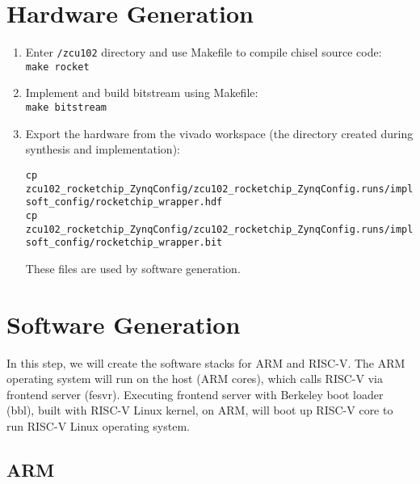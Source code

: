 \documentclass[a4paper,11pt]{article}
\begin{document}
\section{Hardware Generation}
\begin{enumerate}
\item Enter  {\tt \rootdir/zcu102} directory and use Makefile to compile chisel source code:\\
{\tt make rocket}
\item Implement and build bitstream using Makefile:\\
 {\tt make bitstream}
 

\item Export the hardware from the vivado workspace (the directory created during synthesis and implementation):
\begin{lstlisting}
cp zcu102_rocketchip_ZynqConfig/zcu102_rocketchip_ZynqConfig.runs/impl_1/rocketchip_wrapper.sysdef soft_config/rocketchip_wrapper.hdf
cp zcu102_rocketchip_ZynqConfig/zcu102_rocketchip_ZynqConfig.runs/impl_1/rocketchip_wrapper.bit soft_config/rocketchip_wrapper.bit
\end{lstlisting}
These files are used by software generation.
\end{enumerate}

\section{Software Generation}
In this step, we will create the software stacks for ARM and RISC-V. The ARM operating system will run on the host (ARM cores), which calls RISC-V via frontend server (fesvr). Executing frontend server with Berkeley boot loader (bbl), built with RISC-V Linux kernel, on ARM, will boot up RISC-V core to run RISC-V Linux operating system.  

\subsection{ARM}\label{sec-arm}
\end{document}
